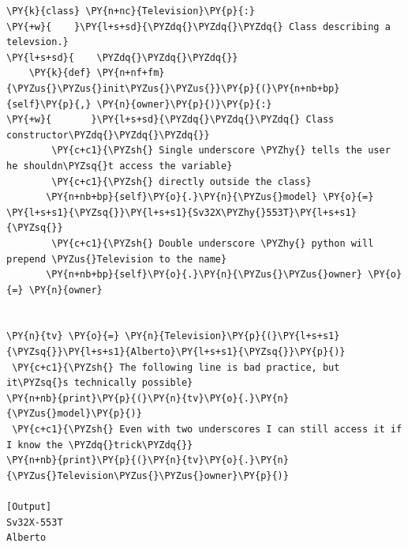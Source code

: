 \begin{Verbatim}[label=\makebox{\url{https://github.com/lucabaldini/cmepda/tree/master/slides/latex/snippets/class\_tv\_private.py}},commandchars=\\\{\}]
\PY{k}{class} \PY{n+nc}{Television}\PY{p}{:}
\PY{+w}{    }\PY{l+s+sd}{\PYZdq{}\PYZdq{}\PYZdq{} Class describing a televsion.}
\PY{l+s+sd}{    \PYZdq{}\PYZdq{}\PYZdq{}}
    \PY{k}{def} \PY{n+nf+fm}{\PYZus{}\PYZus{}init\PYZus{}\PYZus{}}\PY{p}{(}\PY{n+nb+bp}{self}\PY{p}{,} \PY{n}{owner}\PY{p}{)}\PY{p}{:}
\PY{+w}{       }\PY{l+s+sd}{\PYZdq{}\PYZdq{}\PYZdq{} Class constructor\PYZdq{}\PYZdq{}\PYZdq{}}
        \PY{c+c1}{\PYZsh{} Single underscore \PYZhy{} tells the user he shouldn\PYZsq{}t access the variable}
        \PY{c+c1}{\PYZsh{} directly outside the class}
       \PY{n+nb+bp}{self}\PY{o}{.}\PY{n}{\PYZus{}model} \PY{o}{=} \PY{l+s+s1}{\PYZsq{}}\PY{l+s+s1}{Sv32X\PYZhy{}553T}\PY{l+s+s1}{\PYZsq{}}
        \PY{c+c1}{\PYZsh{} Double underscore \PYZhy{} python will prepend \PYZus{}Television to the name}
       \PY{n+nb+bp}{self}\PY{o}{.}\PY{n}{\PYZus{}\PYZus{}owner} \PY{o}{=} \PY{n}{owner}
    

\PY{n}{tv} \PY{o}{=} \PY{n}{Television}\PY{p}{(}\PY{l+s+s1}{\PYZsq{}}\PY{l+s+s1}{Alberto}\PY{l+s+s1}{\PYZsq{}}\PY{p}{)}
 \PY{c+c1}{\PYZsh{} The following line is bad practice, but it\PYZsq{}s technically possible}
\PY{n+nb}{print}\PY{p}{(}\PY{n}{tv}\PY{o}{.}\PY{n}{\PYZus{}model}\PY{p}{)}
 \PY{c+c1}{\PYZsh{} Even with two underscores I can still access it if I know the \PYZdq{}trick\PYZdq{}}
\PY{n+nb}{print}\PY{p}{(}\PY{n}{tv}\PY{o}{.}\PY{n}{\PYZus{}Television\PYZus{}\PYZus{}owner}\PY{p}{)}

[Output]
Sv32X-553T
Alberto
\end{Verbatim}